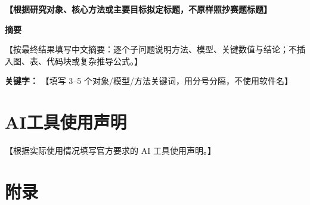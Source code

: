 \documentclass[12pt, a4paper]{ctexart}
\newcommand{\papertitle}[1]{%
  \begin{center}
    {\fontsize{17.3pt}{22pt}\bfseries #1}
  \end{center}
  \vspace{1em}
}
\newcommand{\abstractcn}[2]{%
  \thispagestyle{plain}%
  \begin{center}{\fontsize{14pt}{17pt}\bfseries 摘要}\end{center}
  #1\par
  \vspace{1em}
  {\heiti\bfseries 关键字：}#2\par
  \newpage
}
\newcommand{\aideclaration}[1]{%
  \section*{AI工具使用声明}%
  #1\par
}
\newcommand{\referencescn}{%
}
\newcommand{\appendixcn}{%
  \section*{附录}%
}
\begin{document}
\setcounter{page}{1}
\papertitle{【根据研究对象、核心方法或主要目标拟定标题，不原样照抄赛题标题】}

\abstractcn{%
  【按最终结果填写中文摘要：逐个子问题说明方法、模型、关键数值与结论；不插入图、表、代码块或复杂推导公式。】%
}{%
  【填写 3--5 个对象/模型/方法关键词，用分号分隔，不使用软件名】%
}












\newpage
\aideclaration{【根据实际使用情况填写官方要求的 AI 工具使用声明。】}
\newpage
\referencescn
\newpage
\appendixcn
\end{document}
